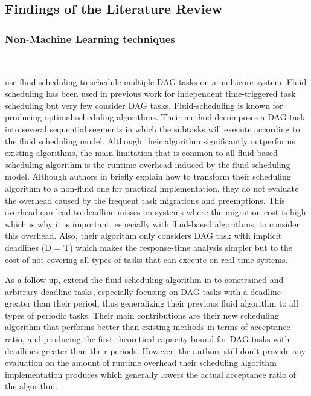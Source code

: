 \subsection{Findings of the Literature Review}

\subsubsection{Non-Machine Learning techniques}
~


\citet{guan2021DAGfluid} 
use fluid scheduling to schedule multiple DAG tasks
on a multicore system. 
Fluid scheduling has been used in previous work for independent
time-triggered task scheduling\cite{baruah1993PFair}\cite{cho2006LLREF} 
but very few consider DAG tasks. Fluid-scheduling is known for producing optimal scheduling algorithms.
Their method decomposes a DAG task into several sequential segments
in which the subtasks will execute according to the fluid scheduling 
model. Although their algorithm significantly outperforms
existing algorithms, the main limitation that is common to all fluid-based
scheduling algorithm is the runtime overhead induced by the fluid-scheduling model.
Although authors in \cite{guan2021DAGfluid} briefly explain how 
to transform their scheduling algorithm to a non-fluid one for practical implementation,
they do not evaluate the overhead caused by the frequent task migrations
and preemptions. This overhead can lead to deadline misses
on systems where the migration cost is high which is why it is important,
especially with fluid-based algorithms, to consider this overhead\cite{migrationCostFairSched}.
 Also, their algorithm only considers DAG task with implicit deadlines
(D = T) which makes the response-time analysis simpler but to the cost
of not covering all types of tasks that can execute on real-time systems.

As a follow up, \citet{GuanFluidDag2022} 
extend the fluid scheduling algorithm in \cite{guan2021DAGfluid}
to constrained and arbitrary deadline tasks,
especially focusing on DAG tasks with a deadline greater than their period,
thus generalizing their previous fluid algorithm
to all types of periodic tasks.
Their main contributions are their new scheduling algorithm that 
performs better than existing methods in terms of acceptance ratio,
and producing the first theoretical capacity bound for DAG tasks
with deadlines greater than their periods.
However, the authors still don't provide any evaluation 
on the amount of runtime overhead their scheduling algorithm implementation
produces which generally lowers the actual acceptance ratio
of the algorithm. 


